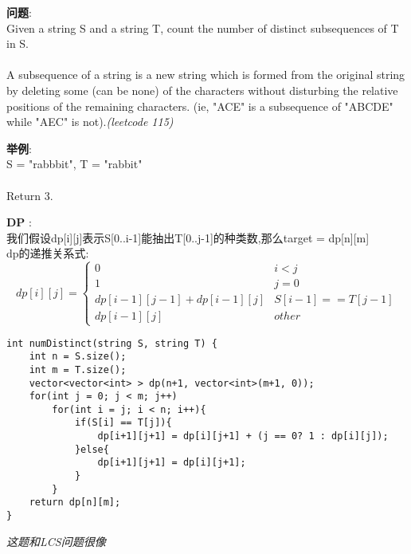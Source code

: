     
\begin{description}
    \item{\textbf{问题}}:\\
Given a string S and a string T, count the number of distinct subsequences of T in S.\\
\\
A subsequence of a string is a new string which is formed from the original string by deleting some (can be none) of the characters without disturbing the relative positions of the remaining characters. (ie, "ACE" is a subsequence of "ABCDE" while "AEC" is not).\textit{(leetcode 115)}

    \item{\textbf{举例}}:\\
S = "rabbbit", T = "rabbit"\\
\\
Return 3.\\
    \item{\textbf{DP}} : 
	\\我们假设dp[i][j]表示S[0..i-1]能抽出T[0..j-1]的种类数,那么target = dp[n][m]
	\\dp的递推关系式:
$$
dp[i][j] =
\begin{cases} 
0 & i < j \\
1 & j = 0 \\
dp[i-1][j-1]+dp[i-1][j] & S[i-1] == T[j-1]\\
dp[i-1][j] & other
\end{cases}
$$
    \begin{lstlisting}
int numDistinct(string S, string T) {
	int n = S.size();
	int m = T.size();
	vector<vector<int> > dp(n+1, vector<int>(m+1, 0));
	for(int j = 0; j < m; j++)
		for(int i = j; i < n; i++){
			if(S[i] == T[j]){
				dp[i+1][j+1] = dp[i][j+1] + (j == 0? 1 : dp[i][j]);
			}else{
				dp[i+1][j+1] = dp[i][j+1];
			}
		}
	return dp[n][m];
}
    \end{lstlisting}
	\textit{这题和LCS问题很像}
\end{description}

